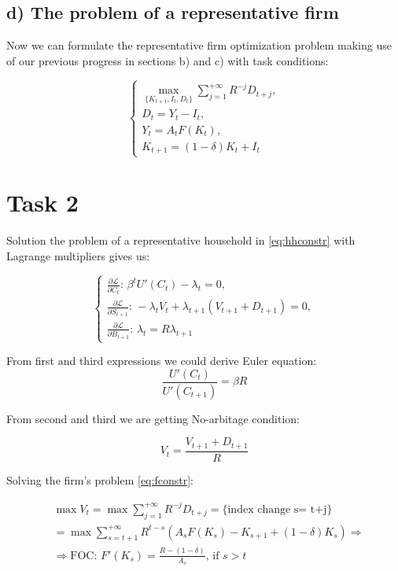 \documentclass{article}
\begin{document}
\subsection*{d) The problem of a representative firm}
Now we can formulate the representative firm optimization problem making use of our previous progress in sections b) and c) with task conditions:

\begin{equation} \label{eq:fconstr}
	\begin{cases}
	\max\limits_{\{K_{t+1}, I_t, D_t\}}\sum_{j=1}^{+\infty}R^{-j}D_{t+j},\\
	D_t = Y_t - I_t,\\
	Y_t = A_t F(K_t), \\
	K_{t+1} = (1-\delta)K_t + I_t
	\end{cases}
\end{equation}

\section*{Task 2} \label{sec:sec2}
Solution the problem of a representative household in \ref{eq:hhconstr} with Lagrange multipliers gives us:

\begin{equation*}
	\begin{cases}
	\frac{\partial \mathcal{L}}{\partial C_t} \text{: } \beta^{t}U'(C_t) - \lambda_t = 0,\\
	\frac{\partial \mathcal{L}}{\partial S_{t+1}} \text{: } -\lambda_t V_t + \lambda_{t+1}(V_{t+1} + D_{t+1}) = 0,\\
	\frac{\partial \mathcal{L}}{\partial B_{t+1}} \text{: } \lambda_t = R\lambda_{t+1}
	\end{cases}
\end{equation*}


From first and third expressions we could derive Euler equation:
\begin{equation} \label{eq:7}
	\frac{U'(C_t)}{U'(C_{t+1})} = \beta R
\end{equation}

From second and third we are getting No-arbitage condition:

\begin{equation}
	V_t = \frac{V_{t+1}+D_{t+1}}{R}
\end{equation}

Solving the firm's problem \ref{eq:fconstr}:

\begin{align*}
	&\max V_t = \max\sum_{j=1}^{+\infty} R^{-j}D_{t+j} = \text{\{ index change s= t+j\}} \\
	&= \max \sum_{s=t+1}^{+\infty}R^{t-s}\left( A_sF(K_s) - K_{s+1} + (1-\delta)K_s \right) \Rightarrow \\
	&\Rightarrow \text{FOC: } F'(K_s) = \frac{R-(1-\delta)}{A_{s}}\text{, if } s>t
\end{align*}
\end{document}
